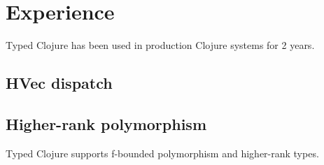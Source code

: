\section{Experience}

Typed Clojure has been used in production Clojure systems for 2 years.

%
%

\subsection{HVec dispatch}

\subsection{Higher-rank polymorphism}

Typed Clojure supports f-bounded polymorphism and higher-rank
types.

